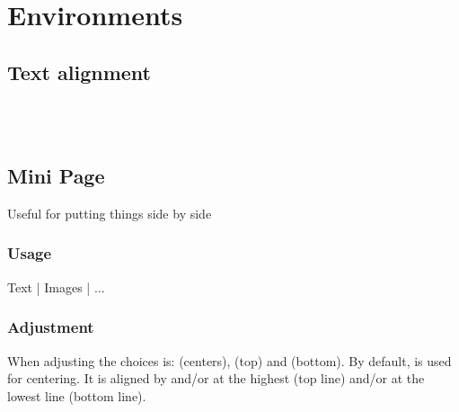 \section{Environments}

\subsection{Text alignment}


 \\
 \\

\subsection{Mini Page} %
Useful for putting things side by side
\subsubsection{Usage}
\begin{latex}
\begin{minipage}[adjusting]{width of the minipage}
 Text | Images | ... 
\end{minipage} 
\end{latex}
\subsubsection{Adjustment}
When adjusting the choices is:  (centers),  (top) and  (bottom).
By default,  is used for centering. It is aligned by  and/or 
at the highest (top line) and/or at the lowest line (bottom line).
